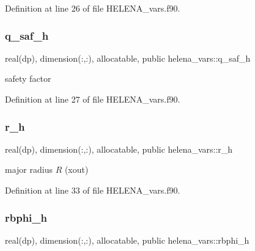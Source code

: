 Definition at line 26 of file H\+E\+L\+E\+N\+A\+\_\+vars.\+f90.

\mbox{\label{namespacehelena__vars_a95906460e4a767f4dd020100b93a631c}} 
\subsubsection{\texorpdfstring{q\+\_\+saf\+\_\+h}{q\_saf\_h}}
{\footnotesize\ttfamily real(dp), dimension(\+:,\+:), allocatable, public helena\+\_\+vars\+::q\+\_\+saf\+\_\+h}



safety factor 



Definition at line 27 of file H\+E\+L\+E\+N\+A\+\_\+vars.\+f90.

\mbox{\label{namespacehelena__vars_a0d157eace0479c9b8cbd4de9495f9775}} 
\subsubsection{\texorpdfstring{r\+\_\+h}{r\_h}}
{\footnotesize\ttfamily real(dp), dimension(\+:,\+:), allocatable, public helena\+\_\+vars\+::r\+\_\+h}



major radius $R$ (xout) 



Definition at line 33 of file H\+E\+L\+E\+N\+A\+\_\+vars.\+f90.

\mbox{\label{namespacehelena__vars_a1983723af0d1de605be96d47ae31d5fc}} 
\subsubsection{\texorpdfstring{rbphi\+\_\+h}{rbphi\_h}}
{\footnotesize\ttfamily real(dp), dimension(\+:,\+:), allocatable, public helena\+\_\+vars\+::rbphi\+\_\+h}



